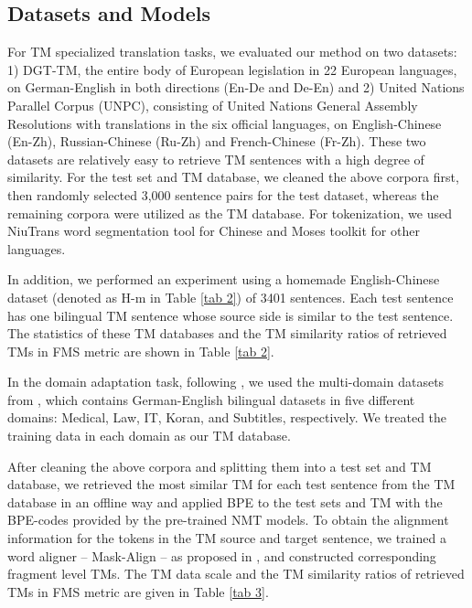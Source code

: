 \documentclass[letterpaper]{article} %
\begin{document}
\subsection{Datasets and Models}

For TM specialized translation tasks, we evaluated our method on two datasets: 1) DGT-TM, the entire body of European legislation in 22 European languages, on German-English in both directions (En-De and De-En) and 2) United Nations Parallel Corpus (UNPC), consisting of United Nations General Assembly Resolutions with translations in the six official languages, on English-Chinese (En-Zh), Russian-Chinese (Ru-Zh) and French-Chinese (Fr-Zh). These two datasets are relatively easy to retrieve TM sentences with a high degree of similarity. For the test set and TM database, we cleaned the above corpora first, then randomly selected 3,000 sentence pairs for the test dataset, whereas the remaining corpora were utilized as the TM database. For tokenization, we used NiuTrans \cite{xiao2012niutrans} word segmentation tool for Chinese and
Moses toolkit \cite{philipp2007moses} for other languages.

In addition, we performed an experiment using a homemade English-Chinese dataset (denoted as H-m in Table \ref{tab 2}) of 3401 sentences. Each test sentence has one bilingual TM sentence whose source side is similar to the test sentence. The statistics of these TM databases and the TM similarity ratios of retrieved TMs in FMS metric are shown in Table \ref{tab 2}.

In the domain adaptation task, following \citet{khandelwal2020nearest}, we used the multi-domain datasets from \citet{aharoni2020unsupervised}, which contains German-English bilingual datasets in five different domains: Medical, Law, IT, Koran, and Subtitles, respectively. We treated the training data in each domain as our TM database.

After cleaning the above corpora and splitting them into a test set and TM database, we retrieved the most similar TM for each test sentence from the TM database in an offline way and applied BPE \cite{2016Neural} to the test sets and TM with the BPE-codes provided by the pre-trained NMT models. To obtain the alignment information for the tokens in the TM source and target sentence, we trained a word aligner -- Mask-Align -- as proposed in \citet{chen2021maskalign}, and constructed corresponding fragment level TMs. The TM data scale and the TM similarity ratios of retrieved TMs in FMS metric are given in Table \ref{tab 3}.
\end{document}
